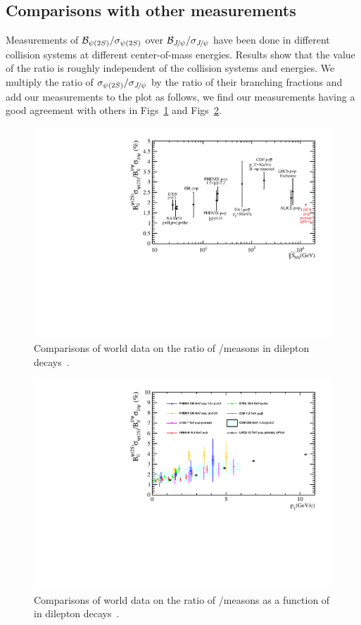 \subsection{Comparisons with other measurements}
\label{Compare}
Measurements of ${\mathcal{B}}_{{\psi{(2S)}}}/\sigma_{{\psi{(2S)}}}$ over ${\mathcal{B}}_{{{J\mskip -3mu/\mskip -2mu\psi}}}/\sigma_{{{J\mskip -3mu/\mskip -2mu\psi}}}$ have been done in different collision systems at different center-of-mass energies. Results show that the value of the ratio is roughly independent of the collision systems and energies. We multiply the ratio of $\sigma_{{\psi{(2S)}}}/\sigma_{{{J\mskip -3mu/\mskip -2mu\psi}}}$ by the ratio of their branching fractions and add our measurements to the plot as follows, we find our measurements having a good agreement with others in Figs~\ref{compare_total} and Figs~\ref{compare_pt}.
\begin{figure}[H]
  \begin{center}
  \includegraphics[width=0.7\linewidth]{pdf/Result/VariousMeasurements.pdf }
  \end{center}
  \caption{Comparisons of world data on the ratio of \psitwos/\jpsi measons in dilepton decays~\cite{PHENIX:2016vmz,NA50:2006rdp,PHENIX:2011gyb,E705:1992vec,NA51:1998uun,Clark:1978mg,UA1:1990eni,CDF:1997ykw,LHCb:2013nqs}.}
\label{compare_total}
\end{figure}
\begin{figure}[H]
  \begin{center}
  \includegraphics[width=0.7\linewidth]{pdf/Result/Comparisons_PT_VariousMeasurements.pdf}
  \end{center}
  \caption{Comparisons of world data on the ratio of \psitwos/\jpsi measons as a function of \pt in dilepton decays~\cite{PHENIX:2016vmz,NA50:2006rdp,PHENIX:2011gyb,E705:1992vec,NA51:1998uun,Clark:1978mg,UA1:1990eni,CDF:1997ykw,LHCb:2013nqs}.}
\label{compare_pt}
\end{figure}
